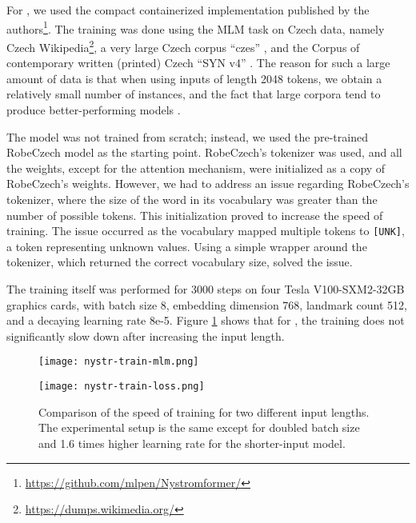 \section{\nystr{}}

For \nystr, we used the compact containerized implementation published by the authors\footnote{\url{https://github.com/mlpen/Nystromformer/}}.
The training was done using the MLM task on Czech data, namely Czech Wikipedia\footnote{\url{https://dumps.wikimedia.org/}}, a very large Czech corpus ``czes'' \citet{czes}, and the Corpus of contemporary written (printed) Czech ``SYN v4'' \citep{syn}. 
The reason for such a large amount of data is that when using inputs of length 2048 tokens, we obtain a relatively small number of instances, and the fact that large corpora tend to produce better-performing models \citep{xlmr}.

The model was not trained from scratch; instead, we used the pre-trained RobeCzech model as the starting point. RobeCzech's tokenizer was used, and all the weights, except for the attention mechanism, were initialized as a copy of RobeCzech's weights.
However, we had to address an issue regarding RobeCzech's tokenizer, where the size of the word in its vocabulary was greater than the number of possible tokens. 
This initialization proved to increase the speed of training.
The issue occurred as the vocabulary mapped multiple tokens to \texttt{[UNK]}, a token representing unknown values.
Using a simple wrapper around the tokenizer, which returned the correct vocabulary size, solved the issue.

The training itself was performed for 3000 steps on four Tesla V100-SXM2-32GB graphics cards, with batch size 8, embedding dimension 768, landmark count 512, and a decaying learning rate 8e-5. Figure \ref{fig:nystr_training} shows that for \nystr{}, the training does not significantly slow down after increasing the input length.

\begin{figure}[!htb]
    \centering
    \begin{minipage}{.49\textwidth}
        \texttt{[image: nystr-train-mlm.png]}
    \end{minipage}
    \hfill
    \begin{minipage}{.49\textwidth}
        \texttt{[image: nystr-train-loss.png]}
    \end{minipage}
    \caption[\nystr{} Training]{Comparison of the speed of training for two different input lengths. The experimental setup is the same except for doubled batch size and 1.6 times higher learning rate for the shorter-input model.}
    \label{fig:nystr_training}
\end{figure}

